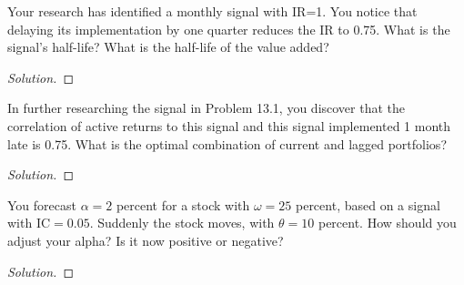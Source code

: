 \begin{problem}{13.1}
  Your research has identified a monthly signal with IR=1. You notice that delaying its implementation by one quarter reduces the IR to 0.75. What is the signal's half-life? What is the half-life of the value added?
\end{problem}

\begin{proof}[Solution]
\end{proof}

\begin{problem}{13.2}
  In further researching the signal in Problem 13.1, you discover that the correlation of active returns to this signal and this signal implemented 1 month late is 0.75. What is the optimal combination of current and lagged portfolios?
\end{problem}

\begin{proof}[Solution]
\end{proof}

\begin{problem}{13.3}
  You forecast $\alpha=2$ percent for a stock with $\omega=25$ percent, based on a signal with $\mathrm{IC}=0.05$. Suddenly the stock moves, with $\theta=10$ percent. How should you adjust your alpha? Is it now positive or negative?
\end{problem}

\begin{proof}[Solution]
\end{proof}